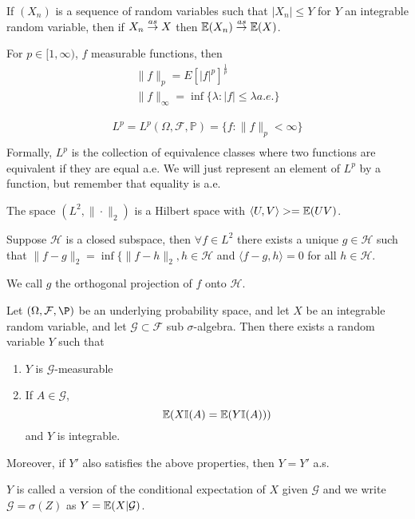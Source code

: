 \begin{thm}
  If $(X_{n})$ is a sequence of random variables such that $|X_{n}|
  \leq Y$ for $Y$ an integrable random variable, then if $X_{n} \overset{as}{\rightarrow}
  X$ then $\E{X_{n}} \cas \E{X}$. 
\end{thm}

\begin{defn}
  \label{defn:9}
  For $p \in [1, \infty)$, $f$ measurable functions, then
  \begin{align}
    \| f \|_{p} = E[|f|^{p}]^{\frac{1}{p}} \\
    \| f \|_{\infty} = \inf \{ \lambda : |f| \leq \lambda a.e. \}
  \end{align}
\end{defn}

\begin{defn}
  \label{defn:10}
  \begin{align*}
    L^{p} = L^{p}(\Omega, \mathcal{F}, \mathbb{P}) = \{ f : \| f
    \|_{p} < \infty \} \\
  \end{align*}
  Formally, $L^{p}$ is the collection of equivalence classes where two
  functions are equivalent if they are equal a.e.  We will just
  represent an element of $L^{p}$ by a function, but remember that
  equality is a.e.
\end{defn}

\begin{thm}
  The space $(L^{2}, \| \cdot \|_{2})$ is a Hilbert space with
  $\langle U, V \rangle> = \E{UV}$.

  Suppose $\mathcal{H}$ is a closed subspace, then $\forall f \in
  L^{2}$ there exists a unique $g \in \mathcal{H}$ such that $\| f - g
  \|_{2} = \inf \{ \| f- h \|_{2}, h \in \mathcal{H}$ and $\langle f
  -g, h \rangle = 0$ for all $h \in \mathcal{H}$.

  We call $g$ the orthogonal projection of $f$ onto $\mathcal{H}$.
\end{thm}


\begin{thm}
  Let $(\Omega, \mathcal{F}, \P)$ be an underlying probability space,
  and let $X$ be an integrable random variable, and let $\mathcal{G}
  \subset \mathcal{F}$ sub $\sigma$-algebra.  Then there exists a
  random variable $Y$ such that
  \begin{enumerate}
  \item $Y$ is $\mathcal{G}$-measurable
  \item If $A \in \mathcal{G}$,
    \begin{equation}
      \label{exmp:general:1}
      \E{X \I{A} = \E{Y \I{A}}}
    \end{equation} and $Y$ is integrable.
  \end{enumerate}
  Moreover, if $Y'$ also satisfies the above properties, then $Y = Y'$ a.s.
\end{thm}
\begin{remark}
  $Y$ is called a version of the conditional expectation of $X$ given
  $\mathcal{G}$ and we write $\mathcal{G} = \sigma(Z)$ as $Y = \E{X |
    \mathcal{G}}$.
\end{remark}



